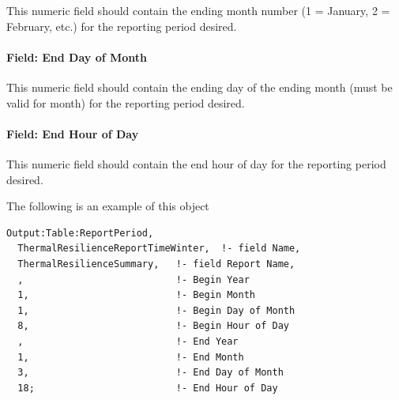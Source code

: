This numeric field should contain the ending month number (1 = January, 2 =
February, etc.) for the reporting period desired.

\paragraph{Field: End Day of Month}\label{field-end-day-of-month-3}

This numeric field should contain the ending day of the ending month (must be
valid for month) for the reporting period desired.

\paragraph{Field: End Hour of Day}\label{field-end-hour-of-day}

This numeric field should contain the end hour of day for the reporting period
desired.

The following is an example of this object

\begin{lstlisting}
Output:Table:ReportPeriod,
  ThermalResilienceReportTimeWinter,  !- field Name,
  ThermalResilienceSummary,   !- field Report Name,
  ,                           !- Begin Year
  1,                          !- Begin Month
  1,                          !- Begin Day of Month
  8,                          !- Begin Hour of Day
  ,                           !- End Year
  1,                          !- End Month
  3,                          !- End Day of Month
  18;                         !- End Hour of Day
\end{lstlisting}
